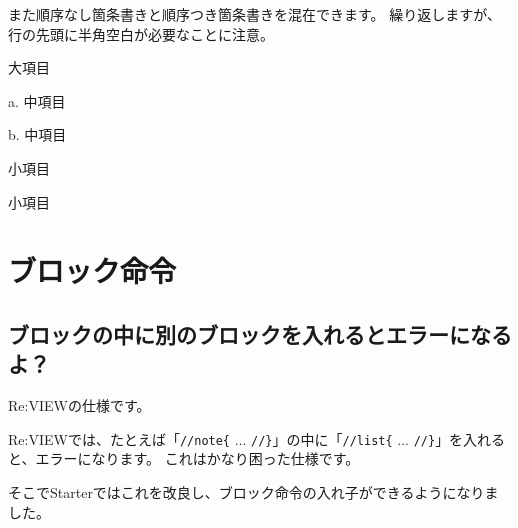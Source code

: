 \endstarterresult

また順序なし箇条書きと順序つき箇条書きを混在できます。
繰り返しますが、行の先頭に半角空白が必要なことに注意。

\begin{starterprogram}\end{starterprogram}
\noindent
{}

\starterresult

\begin{starteritemize}
\item 大項目

\begin{starterenumerate}
\item[a.] 中項目
\item[b.] 中項目

\begin{starteritemize}
\item 小項目
\item 小項目
\end{starteritemize}

\end{starterenumerate}

\end{starteritemize}

\endstarterresult

\section{ブロック命令}
\label{sec:2-3}
\label{sec-faq-block}

\subsection{ブロックの中に別のブロックを入れるとエラーになるよ？}
\label{sec:2-3-1}
\label{subsec-faq-block1}

Re:VIEWの仕様です。

Re:VIEWでは、たとえば「\texttt{//note\{} ... \texttt{//\}}」の中に「\texttt{//list\{} ... \texttt{//\}}」を入れると、エラーになります。
これはかなり困った仕様です。

そこでStarterではこれを改良し、ブロック命令の入れ子ができるようになりました。

\begin{starterprogram}\end{starterprogram}
\noindent
{}

